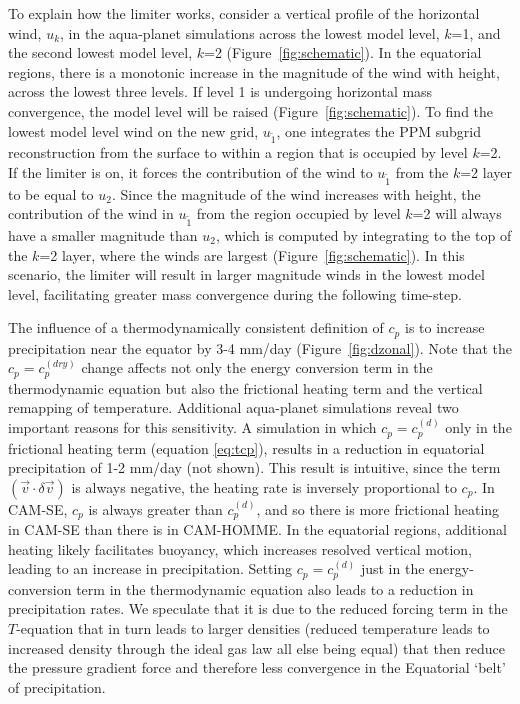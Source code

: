 To explain how the limiter works, consider a vertical profile of the horizontal wind, $u_k$, in the aqua-planet simulations across the lowest model level, $k$=1, and the second lowest model level, $k$=2 (Figure~\ref{fig:schematic}). In the equatorial regions, there is a monotonic increase in the magnitude of the wind with height, across the lowest three levels. If level 1 is undergoing horizontal mass convergence, the model level will be raised (Figure~\ref{fig:schematic}). To find the lowest model level wind on the new grid, $u_{\tilde 1}$, one integrates the PPM subgrid reconstruction from the surface to within a region that is occupied by level $k$=2. If the limiter is on, it forces the contribution of the wind to $u_{\tilde 1}$ from the $k$=2 layer to be equal to $u_2$. Since the magnitude of the wind increases with height, the contribution of the wind in $u_{\tilde 1}$ from the region occupied by level $k$=2 will always have a smaller magnitude than $u_2$, which is computed by integrating to the top of the $k$=2 layer, where the winds are largest (Figure~\ref{fig:schematic}). In this scenario, the limiter will result in larger magnitude winds in the lowest model level, facilitating greater mass convergence during the following time-step.    

The influence of a thermodynamically consistent definition of $c_p$ is to increase precipitation near the equator by 3-4 mm/day (Figure~\ref{fig:dzonal}). Note that the $c_p=c_p^{(dry)}$ change affects not only the energy conversion term in the thermodynamic equation but also the frictional heating term and the vertical remapping of temperature. Additional aqua-planet simulations reveal two important reasons for this sensitivity. A simulation in which $c_p = c_p^{(d)}$ only in the frictional heating term (equation \eqref{eq:tcp}), results in a reduction in equatorial precipitation of 1-2 mm/day (not shown). This result is intuitive, since the term $\left(\vec{v}\cdot \delta \vec{v}\right)$ is always negative, the heating rate is inversely proportional to $c_p$. In CAM-SE, $c_p$ is always greater than $c_p^{(d)}$, and so there is more frictional heating in CAM-SE than there is in CAM-HOMME. In the equatorial regions, additional heating likely facilitates buoyancy, which increases resolved vertical motion, leading to an increase in precipitation. Setting $c_p = c_p^{(d)}$ just in the energy-conversion term in the thermodynamic equation also leads to a reduction in precipitation rates. We speculate that it is due to the reduced forcing term in the $T$-equation that in turn leads to larger densities (reduced temperature leads to increased density through the ideal gas law all else being equal) that then reduce the pressure gradient force and therefore less convergence in the Equatorial `belt' of precipitation.

